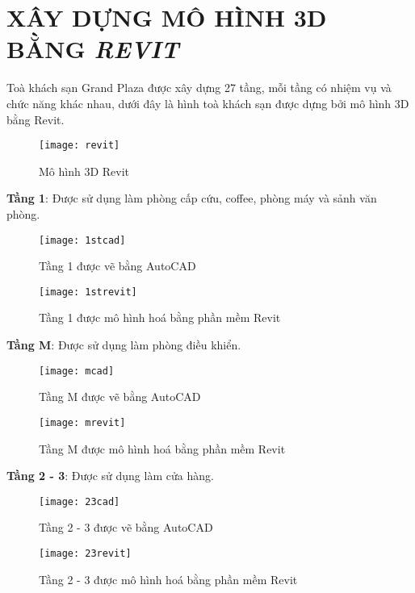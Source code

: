 
\section{XÂY DỰNG MÔ HÌNH 3D BẰNG \emph{REVIT}}
	Toà khách sạn Grand Plaza được xây dựng 27 tầng, mỗi tầng có nhiệm vụ và chức năng khác nhau, dưới đây là hình toà khách sạn được dựng bởi mô hình 3D bằng Revit.

\begin{figure}[H]
	\centering
	\texttt{[image: revit]}
	\caption{Mô hình 3D Revit}
	\label{revit}
\end{figure}

\newpage
\textbf{Tầng 1}: Được sử dụng làm phòng cấp cứu, coffee, phòng máy và sảnh văn phòng.

\begin{figure}[H]
	\centering
	\texttt{[image: 1stcad]}
	\caption{Tầng 1 được vẽ bằng AutoCAD}
	\label{1stcad}
\end{figure}

\begin{figure}[H]
	\centering
	\texttt{[image: 1strevit]}
	\caption{Tầng 1 được mô hình hoá bằng phần mềm Revit}
	\label{1strevit}
\end{figure}

\newpage
\textbf{Tầng M}: Được sử dụng làm phòng điều khiển.

\begin{figure}[H]
	\centering
	\texttt{[image: mcad]}
	\caption{Tầng M được vẽ bằng AutoCAD}
	\label{mcad}
\end{figure}

\begin{figure}[H]
	\centering
	\texttt{[image: mrevit]}
	\caption{Tầng M được mô hình hoá bằng phần mềm Revit}
	\label{mrevit}
\end{figure} 

\newpage
\textbf{Tầng 2 - 3}: Được sử dụng làm cửa hàng.

\begin{figure}[H]
	\centering
	\texttt{[image: 23cad]}
	\caption{Tầng 2 - 3 được vẽ bằng AutoCAD}
	\label{23cad}
\end{figure}

\begin{figure}[H]
	\centering
	\texttt{[image: 23revit]}
	\caption{Tầng 2 - 3 được mô hình hoá bằng phần mềm Revit}
	\label{23revit}
\end{figure} 

